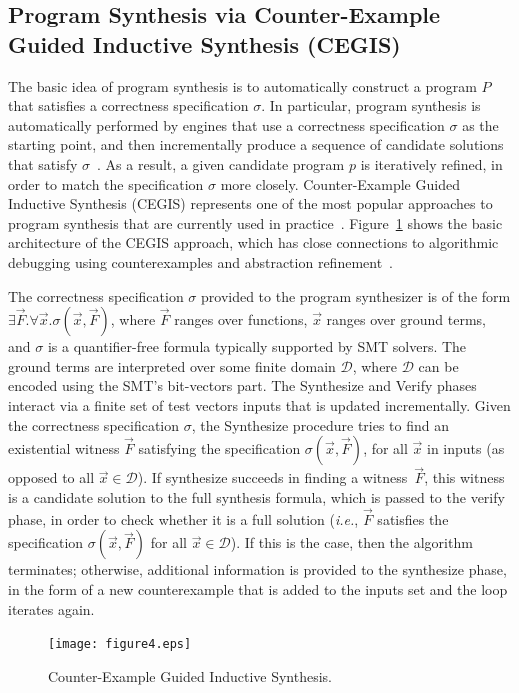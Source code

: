 \documentclass{acm_sen_article}
\begin{document}
\subsection{Program Synthesis via Counter-Example \\ Guided Inductive Synthesis (CEGIS)}

The basic idea of program synthesis is to automatically construct a program $P$ that satisfies a correctness specification $\sigma$. In particular, program synthesis is automatically performed by engines that use a correctness specification $\sigma$ as the starting point, and then incrementally produce a sequence of candidate solutions that satisfy $\sigma$~\cite{Abate17}. As a result, a given candidate program $p$ is iteratively refined, in order to match the specification $\sigma$ more closely. Counter-Example Guided Inductive Synthesis (CEGIS) represents one of the most popular approaches to program synthesis that are currently used in practice~\cite{David15}. Figure~\ref{Counter-Example-Guided-Inductive-Synthesis} shows the basic architecture of the CEGIS approach, which has close connections to algorithmic debugging using counterexamples and abstraction refinement~\cite{Alur13}. 

The correctness specification $\sigma$ provided to the program synthesizer is of the form $\exists \vec{F} .  \forall \vec{x}.  \sigma(\vec{x}, \vec{F})$, where $\vec{F}$ ranges over functions, $\vec{x}$ ranges over ground terms, and $\sigma$ is a quantifier-free formula typically supported by SMT solvers. The ground terms are interpreted over some finite domain $\mathcal{D}$, where $\mathcal{D}$ can be encoded using the SMT's bit-vectors part. The {\sc Synthesize} and {\sc Verify} phases interact via a finite set of test vectors {\sc inputs} that is updated incrementally. Given the correctness specification $\sigma$, the {\sc Synthesize} procedure tries to find an existential witness $\vec{F}$ satisfying the specification $\sigma(\vec{x}, \vec{F})$, for all $\vec{x}$ in {\sc inputs} (as opposed to all $\vec{x} \in \mathcal{D}$). If {\sc synthesize} succeeds in finding a witness~$\vec{F}$, this witness is a candidate solution to the full synthesis formula, which is passed to the {\sc verify} phase, in order to check whether it is a full solution ({\it i.e.}, $\vec{F}$ satisfies the specification $\sigma(\vec{x}, \vec{F})$ for all $\vec{x}\in\mathcal{D}$). If this is the case, then the algorithm terminates; otherwise, additional information is provided to the {\sc synthesize} phase, in the form of a new counterexample that is added to the {\sc inputs} set and the loop iterates again. 
%
\begin{figure}[h]
	\centering
	\texttt{[image: figure4.eps]}
	\caption{Counter-Example Guided Inductive Synthesis.}
	\label{Counter-Example-Guided-Inductive-Synthesis}
\end{figure}
\end{document}
